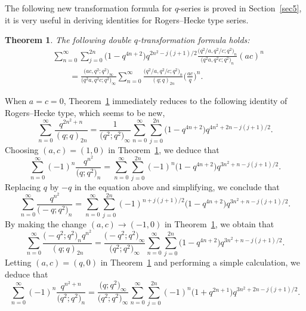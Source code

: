\documentclass[pdftex]{sigma}
\numberwithin{equation}{section}
\newtheorem{Theorem}{Theorem}[section]
\begin{document}
 The following new transformation formula for $q$-series is proved in Section~\ref{sec5}, it is very useful in deriving identities for Rogers--Hecke type series.
\begin{Theorem}\label{trianHecke} The following double $q$-transformation formula holds:
\begin{align}
	&\sum_{n=0}^\infty \sum_{j=0}^{2n} \bigl(1-q^{4n+2}\bigr) q^{2n^2-j(j+1)/2}
	\frac{\bigl(q^2/a, q^2/c; q^2\bigr)_n}{\bigl(q^2a, q^2c; q^2\bigr)_n} (ac)^n\nonumber\\
	&\qquad{}=\frac{\bigl(ac, q^2; q^2\bigr)_\infty}{\bigl(q^2a, q^2c; q^2\bigr)_\infty}
	\sum_{n=0}^\infty \frac{\bigl(q^2/a, q^2/c; q^2\bigr)_n}{(q; q)_{2n}}
	\biggl(\frac{ac}{q}\biggr)^n.\label{trinumbers: eqn1}
\end{align}		
\end{Theorem}	
When $a=c=0$, Theorem~\ref{trianHecke} immediately reduces to the following identity of Rogers--Hecke type, which seems to be new,
\begin{equation}\label{trinumbers:eqn2}
\sum_{n=0}^\infty \frac{q^{2n^2+n}}{(q; q)_{2n}}
=\frac{1}{\bigl(q^2; q^2\bigr)_\infty}
\sum_{n=0}^\infty \sum_{j=0}^{2n} \bigl(1-q^{4n+2}\bigr) q^{4n^2+2n-j(j+1)/2}.
\end{equation}
Choosing $(a, c)=(1, 0)$ in Theorem~\ref{trianHecke}, we deduce that
\begin{equation}\label{trinumbers:eqn3}
\sum_{n=0}^\infty (-1)^n \frac{q^{n^2}}{\bigl(q; q^2\bigr)_n}
=\sum_{n=0}^\infty \sum_{j=0}^{2n} (-1)^n \bigl(1-q^{4n+2}\bigr) q^{3n^2+n-j(j+1)/2}.
\end{equation}
Replacing $q$ by $-q$ in the equation above and simplifying, we conclude that
\begin{equation*}%
\sum_{n=0}^\infty \frac{q^{n^2}}{\bigl(-q; q^2\bigr)_n}
=\sum_{n=0}^\infty \sum_{j=0}^{2n} (-1)^{n+j(j+1)/2} \bigl(1-q^{4n+2}\bigr) q^{3n^2+n-j(j+1)/2}.
\end{equation*}
By making the change $(a, c)\to (-1, 0)$ in Theorem~\ref{trianHecke}, we obtain that
\begin{equation*}%
	\sum_{n=0}^\infty \frac{\bigl(-q^2; q^2\bigr)_n q^{n^2}}{(q; q)_{2n}}
	=\frac{\bigl(-q^2; q^2\bigr)_\infty}{\bigl(q^2; q^2\bigr)_\infty} \sum_{n=0}^\infty \sum_{j=0}^{2n} \bigl(1-q^{4n+2}\bigr) q^{3n^2+n-j(j+1)/2}.	
\end{equation*}
Letting $(a, c)=(q, 0)$ in Theorem~\ref{trianHecke} and performing a simple calculation, we deduce that
\begin{equation*}%
\sum_{n=0}^{\infty} (-1)^n \frac{q^{n^2+n}}{\bigl(q^2; q^2\bigr)_n}
=\frac{\bigl(q; q^2\bigr)_\infty}{\bigl(q^2; q^2\bigr)_\infty}
\sum_{n=0}^{\infty}\sum_{j=0}^{2n} (-1)^n \bigl(1+q^{2n+1}\bigr) q^{3n^2+2n-j(j+1)/2}.
\end{equation*}
\end{document}
